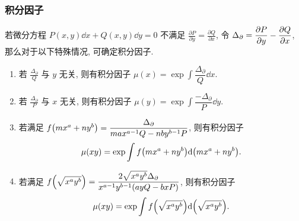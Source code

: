 \subsubsection{积分因子}

\begin{theorem}[积分因子]
    若微分方程 $P(x,y)\dd x+Q(x,y)\dd y=0$ 不满足 $\displaystyle\frac{\partial P}{\partial y}=\frac{\partial Q}{\partial x}$, 
    令 $\Delta _\partial=\displaystyle\pdv{P}{y}-\pdv{Q}{x}$, 那么对于以下特殊情况, 可确定积分因子.
    \begin{enumerate}[label=(\arabic{*})]
        \item 若 $\displaystyle\frac{\Delta _\partial}{Q}$ 与 $y$ 无关, 则有积分因子 $\displaystyle\mu(x)=\exp\int\dfrac{\Delta_\partial}{Q}\dd x.$
        \item 若 $\displaystyle\frac{\Delta _\partial}{P}$ 与 $x$ 无关, 则有积分因子 $\displaystyle\mu(y)=\exp\int\dfrac{-\Delta_\partial}{P}\dd y.$
        \item 若满足 $f\qty(mx^a+ny^b)=\dfrac{\Delta _\partial}{max^{a-1}Q-nby^{b-1}P}$, 则有积分因子 $$\mu(xy)=\exp\int f\qty(mx^a+ny^b)\dd \qty(mx^a+ny^b).$$
        \item 若满足 $f\qty(\sqrt{x^ay^b})=\dfrac{2\sqrt{x^ay^b}\Delta_\partial}{x^{a-1}y^{b-1}(ayQ-bxP)}$, 则有积分因子
              $$\mu(xy)=\exp\int f\qty(\sqrt{x^ay^b})\dd \qty(\sqrt{x^ay^b}).$$
    \end{enumerate}
\end{theorem}

